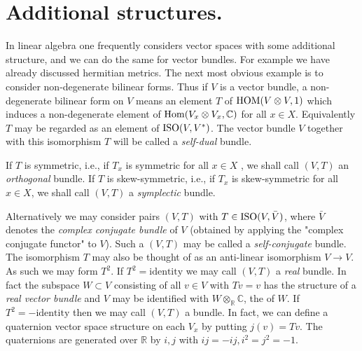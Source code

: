 
\section{Additional structures.}\label{sec:1.5} In linear algebra one frequently considers vector spaces with some additional structure, and we can do the same for vector bundles. For example we have already discussed hermitian metrics. The next most obvious example is to consider non-degenerate bilinear forms. Thus if $V$ is a vector bundle, a non-degenerate bilinear form on $V$ means an element $T$ of $\operatorname{HOM}(V \otimes V, 1)$ which induces a non-degenerate element of $\operatorname{Hom}(V_x \otimes V_x, \mathbb{C})$ for all $x \in X$. Equivalently $T$ may be regarded as an element of $\operatorname{ISO}(V, V^*)$. The vector bundle $V$ together with this isomorphism $T$ will be called a \textit{self-dual} bundle. \par 

If $T$ is symmetric, i.e., if $T_x$ is symmetric for all $x \in X$ , we shall call $(V, T)$ an \textit{orthogonal} bundle. If $T$ is skew-symmetric, i.e., if $T_x$ is skew-symmetric for all $x \in X$, we shall call $(V, T)$ a \textit{symplectic} bundle. \par 

Alternatively we may consider pairs $(V, T)$ with $T \in \operatorname{ISO}(V, \bar{V})$, where $\bar{V}$ denotes the \textit{complex conjugate bundle} of $V$ (obtained by applying the "complex conjugate functor" to $V$). Such a $(V, T)$ may be called a \textit{self-conjugate} bundle. The isomorphism $T$ may also be thought of as an anti-linear isomorphism $V \to V$. As such we may form $T^2$. If $T^2 = \text{identity}$ we may call $(V, T)$ a \textit{real} bundle. In fact the subspace $W \subset V$ consisting of all $v \in V$ with $Tv = v$ has the structure of a\textit{ real vector bundle} and $V$ may be identified with $W \otimes_\mathbb{R} \mathbb{C}$, the  of $W$. If $T^2 = -\text{identity}$ then we may call $(V, T)$ a  bundle. In fact, we can define a quaternion vector space structure on each $V_x$ by putting $j(v) = Tv$. The quaternions are generated over $\mathbb{R}$ by $i, j$ with $ij = -ij, i^2 = j^2 = -1$. \par 

